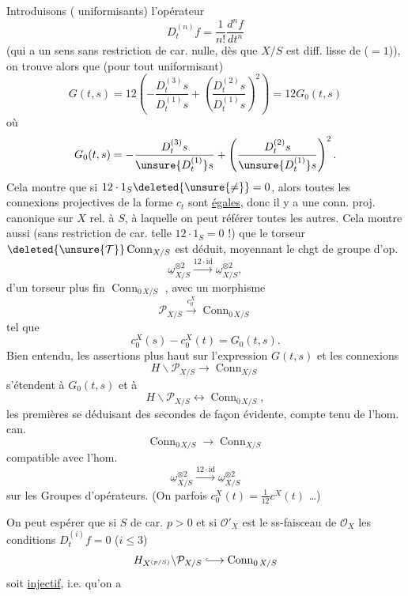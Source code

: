 Introduisons (   uniformisants) l'opérateur
\[
D_t^{(n)}f=\frac1{n!}\frac{d^nf}{dt^n}
\]
(qui a un sens sans restriction de car. nulle, dès que $X/S$ est diff. lisse de   ($=1$)), on trouve alors que (pour tout uniformisant)
\[
G(t,s)=12\left(-\frac{D_t^{(3)}s}{D_t^{(1)}s}+\left(\frac{D_t^{(2)}s}{D_t^{(1)}s}\right)^2\right)=12G_0(t,s)
\]
où
\[
G_0(t,s)=-\frac{D_t^{(3)}s}{\unsure{D_t^{(1)}}s}+\left(\frac{D_t^{(2)}s}{\unsure{D_t^{(1)}}s}\right)^2.
\]
Cela montre que si $12\cdot1_S\deleted{\unsure{\ne}}=0$, alors toutes les connexions projectives de la forme $c_t$ sont \uline{égales}, donc il y a une conn. proj. canonique sur $X$ rel. à $S$, à laquelle on peut référer toutes les autres. Cela montre aussi (sans restriction de car. telle $12\cdot1_S=0$ !) que le torseur $\deleted{\unsure{\mathcal T}}\operatorname{Conn}_{X/S}$ est déduit, moyennant le chgt de groupe d'op.
\[
\underline\omega_{X/S}^{\otimes2}\xrightarrow{12\cdot\mathrm{id}}\underline\omega_{X/S}^{\otimes2},
\]
d'un torseur plus fin $\operatorname{Conn}_{0\,X/S}$ , avec un morphisme
\[
\mathcal P_{X/S}\xrightarrow{c_0^X}\operatorname{Conn}_{0\,X/S}
\]
tel que
\[
c_0^X(s)-c_0^X(t)=G_0(t,s).
\]
Bien entendu, les assertions plus haut sur l'expression $G(t,s)$ et les connexions
\[
H\backslash\mathcal P_{X/S}\longrightarrow\operatorname{Conn}_{X/S}
\]
s'étendent à $G_0(t,s)$ et à
\[
H\backslash\mathcal P_{X/S}\longleftrightarrow\operatorname{Conn}_{0\,X/S},
\]
les premières se déduisant des secondes de façon évidente, compte tenu de l'hom. can.
\[
\operatorname{Conn}_{0\,X/S}\longrightarrow\operatorname{Conn}_{X/S}
\]
compatible avec l'hom.
\[
\underline\omega_{X/S}^{\otimes2}\xrightarrow{12\cdot\mathrm{id}}\underline\omega_{X/S}^{\otimes2}
\]
sur les Groupes d'opérateurs. (On   parfois $c_0^X(t)=\frac1{12}c^X(t)$ \ldots)

On peut espérer que si $S$ de car. $p>0$ et si $\mathcal O'_X$ est le ss-faisceau de $\mathcal O_X$   les conditions $D_t^{(i)}f=0$ ($i\le3$)
\[
H_{X^{(p/S)}}\backslash\mathcal P_{X/S}\lhook\joinrel\longrightarrow\operatorname{Conn}_{0\,X/S}
\]
soit \uline{injectif}, i.e. qu'on a

